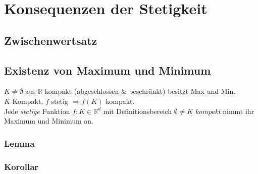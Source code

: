 \documentclass[10pt,a4paper^, twocolumn]{article}
\newcommand{\R}{\mathbb{R}}
\begin{document}
\section{Konsequenzen der Stetigkeit}
	\subsection{Zwischenwertsatz} 
	\subsection{Existenz von Maximum und Minimum}
	$K \neq \emptyset$ aus $\R$ kompakt (abgeschlossen \& beschränkt) besitzt Max und Min.\\
	$K$ Kompakt, $f$ stetig $\Rightarrow f(K) $ kompakt.\\
	Jede \emph{stetige} Funktion $f: K \in \R^d$ mit Definitionsbereich $\emptyset \neq K$
	\emph{kompakt} nimmt ihr Maximum und Minimum an.
		\subsubsection{Lemma}
		\subsubsection{Korollar}
\end{document}
